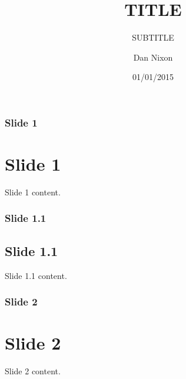\documentclass[xetex,serif,t]{beamer}
\title{TITLE}
\subtitle{SUBTITLE}
\author{Dan Nixon}
\date{01/01/2015}
\newenvironment{slide}[1]
{
  \begin{frame}
    \frametitle{#1}
    \section{#1}
}
{
  \end{frame}
}
\newenvironment{subslide}[1]
{
  \begin{frame}
    \frametitle{#1}
    \subsection{#1}
}
{
  \end{frame}
}
\begin{document}
  \frame{\titlepage}

  \begin{slide}{Slide 1}
    Slide 1 content.
  \end{slide}

  \begin{subslide}{Slide 1.1}
    Slide 1.1 content.
  \end{subslide}

  \begin{slide}{Slide 2}
    Slide 2 content.
  \end{slide}
\end{document}
